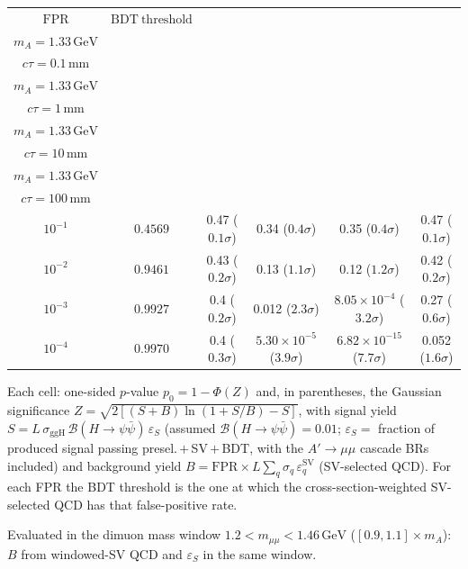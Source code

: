\documentclass[10pt,a4paper]{article}
\begin{document}
{\begin{tabular}{cccccc}
\toprule
$\mathrm{FPR}$ & $\mathrm{BDT\ threshold}$ & \shortstack{$m_{\pi}=4\,\mathrm{GeV}$\\$m_{A}=1.33\,\mathrm{GeV}$\\$c\tau=0.1\,\mathrm{mm}$} & \shortstack{$m_{\pi}=4\,\mathrm{GeV}$\\$m_{A}=1.33\,\mathrm{GeV}$\\$c\tau=1\,\mathrm{mm}$} & \shortstack{$m_{\pi}=4\,\mathrm{GeV}$\\$m_{A}=1.33\,\mathrm{GeV}$\\$c\tau=10\,\mathrm{mm}$} & \shortstack{$m_{\pi}=4\,\mathrm{GeV}$\\$m_{A}=1.33\,\mathrm{GeV}$\\$c\tau=100\,\mathrm{mm}$} \\
\midrule
$10^{-1}$ & $0.4569$ & 0.47 ($0.1\sigma$) & 0.34 ($0.4\sigma$) & 0.35 ($0.4\sigma$) & 0.47 ($0.1\sigma$)\\
$10^{-2}$ & $0.9461$ & 0.43 ($0.2\sigma$) & 0.13 ($1.1\sigma$) & 0.12 ($1.2\sigma$) & 0.42 ($0.2\sigma$)\\
$10^{-3}$ & $0.9927$ & 0.4 ($0.2\sigma$) & 0.012 ($2.3\sigma$) & $8.05\times10^{-4}$ ($3.2\sigma$) & 0.27 ($0.6\sigma$)\\
$10^{-4}$ & $0.9970$ & 0.4 ($0.3\sigma$) & $5.30\times10^{-5}$ ($3.9\sigma$) & $6.82\times10^{-15}$ ($7.7\sigma$) & 0.052 ($1.6\sigma$)\\
\bottomrule
\end{tabular}

{\small Each cell: one-sided $p$-value $p_0=1-\Phi(Z)$ and, in parentheses, the Gaussian significance $Z=\sqrt{2\left[(S{+}B)\ln(1{+}S/B)-S\right]}$, with signal yield $S=L\,\sigma_{\mathrm{ggH}}\,\mathcal{B}(H\to\psi\bar{\psi})\,\varepsilon_S$ (assumed $\mathcal{B}(H\to\psi\bar{\psi})=0.01$; $\varepsilon_S=$ fraction of produced signal passing presel.\,$+$\,SV\,$+$\,BDT, with the $A'\to\mu\mu$ cascade BRs included) and background yield $B=\mathrm{FPR}\times L\sum_q\sigma_q\,\varepsilon_q^{\mathrm{SV}}$ (SV-selected QCD). For each FPR the BDT threshold is the one at which the cross-section-weighted SV-selected QCD has that false-positive rate.}

{\small Evaluated in the dimuon mass window $1.2<m_{\mu\mu}<1.46\,\mathrm{GeV}$ ($[0.9,1.1]\times m_A$): $B$ from windowed-SV QCD and $\varepsilon_S$ in the same window.}

}\clearpage
\end{document}
